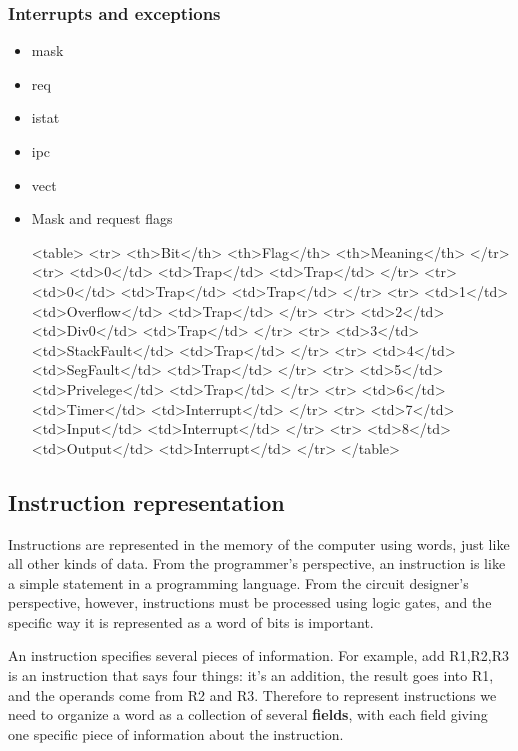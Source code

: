 \documentclass[11pt]{article}
\begin{document}
\subsubsection*{Interrupts and exceptions}
\label{sec:org6c24db1}

\begin{itemize}
\item mask

\item req

\item istat

\item ipc

\item vect
\end{itemize}

\begin{itemize}
\item Mask and request flags
\label{sec:org37b5ff1}

<table>
  <tr>
    <th>Bit</th>
    <th>Flag</th>
    <th>Meaning</th>
  </tr>
  <tr>
    <td>0</td>
    <td>Trap</td>
    <td>Trap</td>
  </tr>
  <tr>
    <td>0</td>
    <td>Trap</td>
    <td>Trap</td>
  </tr>
  <tr>
    <td>1</td>
    <td>Overflow</td>
    <td>Trap</td>
  </tr>
  <tr>
    <td>2</td>
    <td>Div0</td>
    <td>Trap</td>
  </tr>
  <tr>
    <td>3</td>
    <td>StackFault</td>
    <td>Trap</td>
  </tr>
  <tr>
    <td>4</td>
    <td>SegFault</td>
    <td>Trap</td>
  </tr>
  <tr>
    <td>5</td>
    <td>Privelege</td>
    <td>Trap</td>
  </tr>
  <tr>
    <td>6</td>
    <td>Timer</td>
    <td>Interrupt</td>
  </tr>
  <tr>
    <td>7</td>
    <td>Input</td>
    <td>Interrupt</td>
  </tr>
  <tr>
    <td>8</td>
    <td>Output</td>
    <td>Interrupt</td>
  </tr>
</table>
\end{itemize}

\subsection*{Instruction representation}
\label{sec:orgbeac32c}

Instructions are represented in the memory of the computer using
words, just like all other kinds of data.  From the programmer's
perspective, an instruction is like a simple statement in a
programming language.  From the circuit designer's perspective,
however, instructions must be processed using logic gates, and the
specific way it is represented as a word of bits is important.

An instruction specifies several pieces of information.  For example,
add R1,R2,R3 is an instruction that says four things: it's an
addition, the result goes into R1, and the operands come from R2 and
R3.  Therefore to represent instructions we need to organize a word as
a collection of several \textbf{fields}, with each field giving one specific
piece of information about the instruction.
\end{document}
